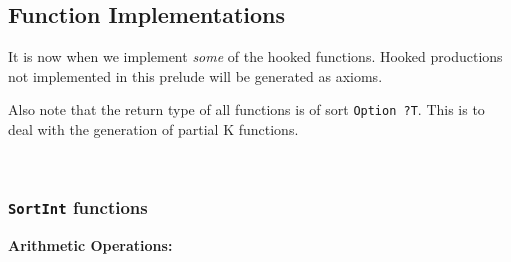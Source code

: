 \subsection{Function Implementations}

It is now when we implement \textit{some} of the hooked functions.
Hooked productions not implemented in this prelude will be generated as axioms.

Also note that the return type of all functions is of sort \texttt{Option ?T}.
This is to deal with the generation of partial K functions.

\\
\subsubsection{\texttt{SortInt} functions}

\textbf{Arithmetic Operations:}

